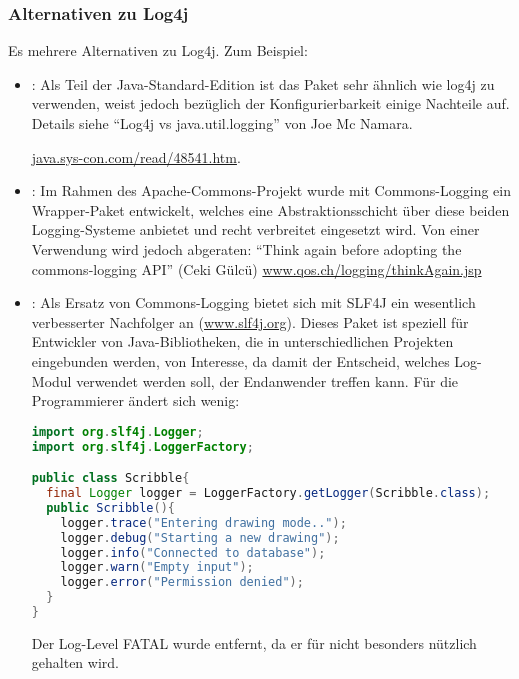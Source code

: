 \subsubsection{Alternativen zu Log4j}
Es mehrere Alternativen zu Log4j. Zum Beispiel:
\begin{itemize}
\item {}:
Als Teil der Java-Standard-Edition ist das Paket sehr ähnlich wie
log4j zu verwenden, weist jedoch bezüglich der Konfigurierbarkeit einige
 Nachteile auf. Details siehe ``Log4j vs java.util.logging''  von Joe
 Mc Namara.

  \href{http://java.sys-con.com/read/48541.htm}
                {java.sys-con.com/read/48541.htm}.
\newslide
\item {}:
 Im Rahmen des Apache-Commons-Projekt wurde mit Com\-mons-Logging
ein Wrapper-Paket entwickelt, welches
eine Abstraktionsschicht über diese beiden Logging-Systeme anbietet und
recht verbreitet eingesetzt wird. Von einer Verwendung wird
jedoch abgeraten:
``Think again before adopting the commons-logging API'' (Ceki Gülcü)
\href{http://www.qos.ch/logging/thinkAgain.jsp}
  {www.qos.ch/logging/thinkAgain.jsp}
\newslide
\item {}:
Als Ersatz von Commons-Logging bietet sich mit SLF4J
ein wesentlich verbesserter Nachfolger
an (\href{http://www.slf4j.org}{www.slf4j.org}).
Dieses Paket ist speziell für Entwickler von
Java-Bib\-lio\-theken, die in unterschiedlichen Projekten eingebunden
werden, von Interesse, da damit der Entscheid, welches Log-Modul
verwendet werden soll, der Endanwender treffen kann.
\newslide
Für die Programmierer ändert sich wenig:
\begin{lstlisting}[language=java]
import org.slf4j.Logger;
import org.slf4j.LoggerFactory;

public class Scribble{
  final Logger logger = LoggerFactory.getLogger(Scribble.class);
  public Scribble(){
    logger.trace("Entering drawing mode..");
    logger.debug("Starting a new drawing");
    logger.info("Connected to database");
    logger.warn("Empty input");
    logger.error("Permission denied");
  }
}
\end{lstlisting}
Der Log-Level FATAL wurde entfernt, da er für nicht besonders nützlich
gehalten wird.


\end{itemize}
